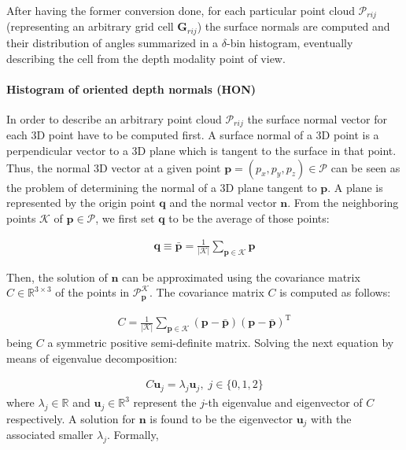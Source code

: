 \documentclass[10pt,twocolumn,letterpaper]{article}
\begin{document}
After having the former conversion done, for each particular point cloud $\mathcal{P}_{rij}$ (representing an arbitrary grid cell $\mathbf{G}_{rij}$) the surface normals are computed and their distribution of angles summarized in a $\delta$-bin histogram, eventually describing the cell from the depth modality point of view.

\paragraph{Histogram of oriented depth normals (HON)} 
In order to describe an arbitrary point cloud $\mathcal{P}_{rij}$ the surface normal vector for each 3D point have to be computed first. A surface normal of a 3D point is a perpendicular vector to a 3D plane which is tangent to the surface in that point. Thus, the normal 3D vector at a given point $\mathbf{p} = (p_x, p_y, p_z) \in \mathcal{P}$ can be seen as the problem of determining the normal of a 3D plane tangent to $\mathbf{p}$. A plane is represented by the origin point $\mathbf{q}$ and the normal vector $\mathbf{n}$. From the neighboring points $\mathcal{K}$ of $\mathbf{p} \in \mathcal{P}$, we first set $\mathbf{q}$ to be the average of those points:

\begin{gather}
	\mathbf{q} \equiv \bar{\mathbf{p}} = \frac{1}{|\mathcal{K}|} \sum_{\mathbf{p} \in \mathcal{K}} \mathbf{p}
\end{gather}
 
Then, the solution of $\mathbf{n}$ can be approximated using the covariance matrix $C \in \mathbb{R}^{3 \times 3}$ of the points in $\mathcal{P}_\mathbf{p}^{\mathcal{K}}$. The covariance matrix $C$ is computed as follows: 

\begin{gather}
	C = \frac{1}{|\mathcal{K}|} \sum_{\mathbf{p} \in \mathcal{K}} (\mathbf{p} - \bar{\mathbf{p}}) (\mathbf{p} - \bar{\mathbf{p}})^{\mathrm{T}}
\end{gather}
being $C$ a symmetric positive semi-definite matrix. Solving the next equation by means of eigenvalue decomposition:

\begin{gather}
	C \mathbf{u}_j = \lambda_j \mathbf{u}_j, \; j \in \{0,1,2\}
\end{gather}
where $\lambda_j \in \mathbb{R}$ and $\mathbf{u}_j \in \mathbb{R}^3$ represent the $j$-th eigenvalue and eigenvector of $C$ respectively. A solution for $\mathbf{n}$ is found to be the eigenvector $\mathbf{u}_j$ with the associated smaller $\lambda_j$. Formally,
\end{document}
